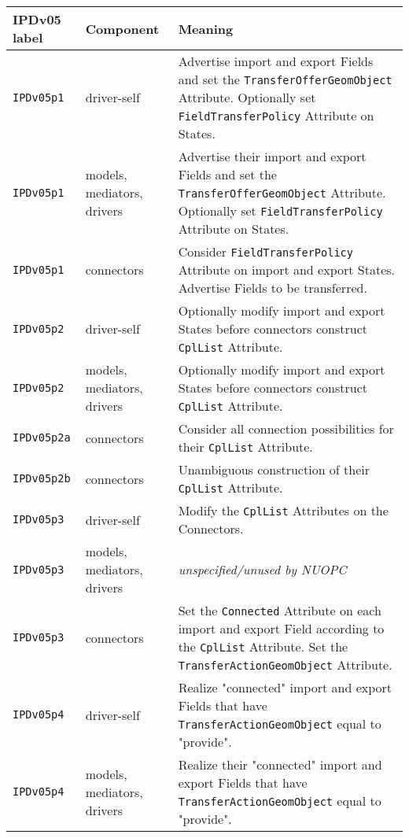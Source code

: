 \vspace*{3ex}
\begin{longtable}[h]{|p{35mm}|p{4cm}|p{6cm}|}
     \hline\hline
     {\bf IPDv05 label} & {\bf Component} & {\bf Meaning}\\
     \hline\hline
     {\tt IPDv05p1}   & driver-self                 & Advertise import and export Fields and set the {\tt TransferOfferGeomObject} Attribute. Optionally set {\tt FieldTransferPolicy} Attribute on States. \\ \hline
     {\tt IPDv05p1}   & models, mediators, drivers  & Advertise their import and export Fields and set the {\tt TransferOfferGeomObject} Attribute. Optionally set {\tt FieldTransferPolicy} Attribute on States. \\ \hline
     {\tt IPDv05p1}   & connectors                  & Consider {\tt FieldTransferPolicy} Attribute on import and export States. Advertise Fields to be transferred. \\ \hline
     {\tt IPDv05p2}   & driver-self                 & Optionally modify import and export States before connectors construct {\tt CplList} Attribute. \\ \hline
     {\tt IPDv05p2}   & models, mediators, drivers  & Optionally modify import and export States before connectors construct {\tt CplList} Attribute. \\ \hline
     {\tt IPDv05p2a}  & connectors                  & Consider all connection possibilities for their {\tt CplList} Attribute.\\ \hline
     {\tt IPDv05p2b}  & connectors                  & Unambiguous construction of their {\tt CplList} Attribute.\\ \hline
     {\tt IPDv05p3}   & driver-self                 & Modify the {\tt CplList} Attributes on the Connectors.\\ \hline
     {\tt IPDv05p3}   & models, mediators, drivers  & {\em unspecified/unused by NUOPC}\\ \hline
     {\tt IPDv05p3}   & connectors                  & Set the {\tt Connected} Attribute on each import and export Field according to the {\tt CplList} Attribute. Set the {\tt TransferActionGeomObject} Attribute.\\ \hline
     {\tt IPDv05p4}   & driver-self                 & Realize "connected" import and export Fields that have {\tt TransferActionGeomObject} equal to "provide".\\ \hline
     {\tt IPDv05p4}   & models, mediators, drivers  & Realize their "connected" import and export Fields that have {\tt TransferActionGeomObject} equal to "provide".\\ \hline

\end{longtable}
